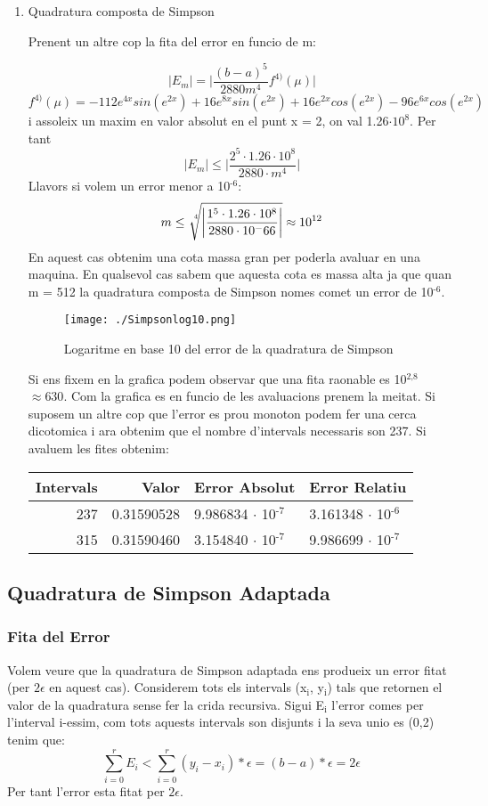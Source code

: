 \documentclass{article}
\begin{document}
\begin{enumerate}
\item Quadratura composta de Simpson
\label{sec:orga76fc2e}

Prenent un altre cop la fita del error en funcio de m: 

\[
\lvert E_m \rvert = \bigg\lvert \frac{(b-a)^5}{2880m^4}f^{4)}(\mu) \bigg\rvert
\]
\[
f^{4)}(\mu) = -112e^{4x}sin(e^{2x})+16e^{8x}sin(e^{2x})+16e^{2x}cos(e^{2x})-96e^{6x}cos(e^{2x})
\]
i assoleix un maxim en valor absolut en el punt x = 2, on val 1.26\(\cdot 10^8\). Per tant
\[
\lvert E_m \rvert \leq \bigg\lvert \frac{2^5\cdot 1.26 \cdot 10^8}{2880\cdot m^4} \bigg\rvert
\] 
Llavors si volem un error menor a 10\(^{\text{-6}}\):
\[
 m \leq \sqrt[\leftroot{-3}\uproot{3}4]{\bigg\lvert \frac{1^5\cdot 1.26 \cdot 10^8}{2880 \cdot 10^-66} \bigg\rvert} \approx 10^{12} 
\]
En aquest cas obtenim una cota massa gran per poderla avaluar en una maquina. En qualsevol cas sabem que aquesta cota es massa alta ja que quan m = 512 la quadratura composta de Simpson nomes comet un error de 10\(^{\text{-6}}\).

\begin{figure}[htbp]
\centering
\texttt{[image: ./Simpsonlog10.png]}
\caption{Logaritme en base 10 del error de la quadratura de Simpson}
\end{figure}

Si ens fixem en la grafica podem observar que una fita raonable es 10\(^{\text{2,8}}\) \(\approx 630\). Com la grafica es en funcio de les avaluacions prenem la meitat.
Si suposem un altre cop que l'error es prou monoton podem fer una cerca dicotomica i ara obtenim que el nombre d'intervals necessaris son 237.
Si avaluem les fites obtenim:
\begin{center}
\begin{tabular}{rrll}
Intervals & Valor & Error Absolut & Error Relatiu\\
\hline
237 & 0.31590528 & 9.986834 \(\cdot\) 10\(^{\text{-7}}\) & 3.161348 \(\cdot\) 10\(^{\text{-6}}\)\\
315 & 0.31590460 & 3.154840 \(\cdot\) 10\(^{\text{-7}}\) & 9.986699 \(\cdot\) 10\(^{\text{-7}}\)\\
\end{tabular}
\end{center}
\end{enumerate}
\subsection{Quadratura de Simpson Adaptada}
\label{sec:org52b186e}
\subsubsection{Fita del Error}
\label{sec:org5253b07}
Volem veure que la quadratura de Simpson adaptada ens produeix un error fitat (per \(2\epsilon\) en aquest cas). Considerem tots els intervals (x\(_{\text{i}}\), y\(_{\text{i}}\)) tals que retornen el valor de la quadratura sense fer la crida recursiva. Sigui E\(_{\text{i}}\) l'error comes per l'interval i-essim, com tots aquests intervals son disjunts i la seva unio es (0,2) tenim que:
\[ \sum_{i=0}^{r} E_{i} < \sum_{i=0}^{r} (y_i - x_i)*\epsilon = (b-a)*\epsilon = 2\epsilon \]
Per tant l'error esta fitat per \(2\epsilon.\)
\end{document}
